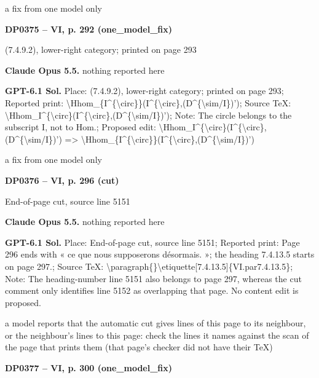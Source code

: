 a fix from one model only\par
\par\noindent\hypertarget{DP0375}{}\textbf{DP0375 -- VI, p. 292 (one\_model\_fix)}\par
(7.4.9.2), lower-right category; printed on page 293\par
\textbf{Claude Opus 5.5.} nothing reported here\par
\textbf{GPT-6.1 Sol.} Place: (7.4.9.2), lower-right category; printed on page 293; Reported print: \textbackslash{}Hhom\_\{I\textasciicircum{}\{\textbackslash{}circ\}\}(I\textasciicircum{}\{\textbackslash{}circ\},(D\textasciicircum{}\{\textbackslash{}sim/I\})'); Source TeX: \textbackslash{}Hhom\_I\textasciicircum{}\{\textbackslash{}circ\}(I\textasciicircum{}\{\textbackslash{}circ\},(D\textasciicircum{}\{\textbackslash{}sim/I\})'); Note: The circle belongs to the subscript I, not to Hom.; Proposed edit: \textbackslash{}Hhom\_I\textasciicircum{}\{\textbackslash{}circ\}(I\textasciicircum{}\{\textbackslash{}circ\},(D\textasciicircum{}\{\textbackslash{}sim/I\})') =\allowbreak > \textbackslash{}Hhom\_\{I\textasciicircum{}\{\textbackslash{}circ\}\}(I\textasciicircum{}\{\textbackslash{}circ\},(D\textasciicircum{}\{\textbackslash{}sim/I\})')\par
a fix from one model only\par
\par\noindent\hypertarget{DP0376}{}\textbf{DP0376 -- VI, p. 296 (cut)}\par
End-of-page cut, source line 5151\par
\textbf{Claude Opus 5.5.} nothing reported here\par
\textbf{GPT-6.1 Sol.} Place: End-of-page cut, source line 5151; Reported print: Page 296 ends with « ce que nous supposerons désormais. »; the heading 7.4.13.5 starts on page 297.; Source TeX: \textbackslash{}paragraph\{\}\textbackslash{}etiquette[7.4.13.5]\{VI.par7.4.13.5\}; Note: The heading-number line 5151 also belongs to page 297, whereas the cut comment only identifies line 5152 as overlapping that page. No content edit is proposed.\par
a model reports that the automatic cut gives lines of this page to its neighbour, or the neighbour's lines to this page: check the lines it names against the scan of the page that prints them (that page's checker did not have their TeX)\par
\par\noindent\hypertarget{DP0377}{}\textbf{DP0377 -- VI, p. 300 (one\_model\_fix)}\par
